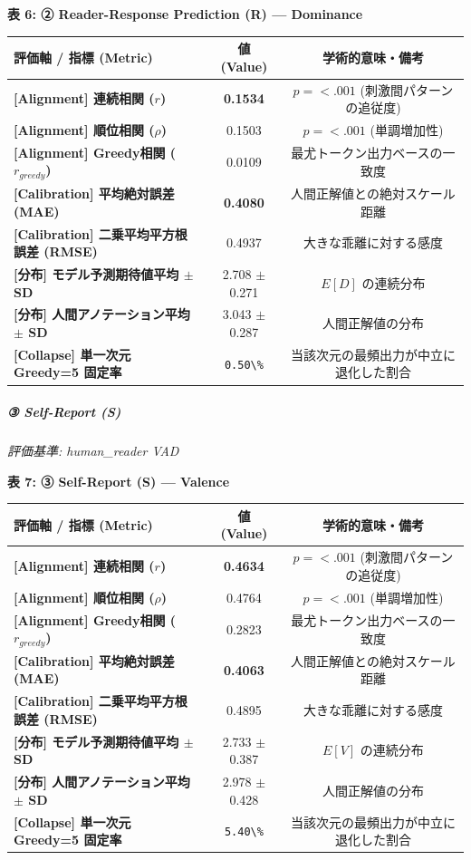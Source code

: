 \textbf{表 6: ② Reader-Response Prediction (R) — Dominance}
\begin{center}
\small
\begin{tabular}{lcc}
\toprule
\textbf{評価軸 / 指標 (Metric)} & \textbf{値 (Value)} & \textbf{学術的意味・備考} \\
\midrule
\textbf{[Alignment] 連続相関 ($r$)} & \textbf{0.1534} & $p = <.001 $ (刺激間パターンの追従度) \\
\textbf{[Alignment] 順位相関 ($\rho$)} & 0.1503 & $p = <.001 $ (単調増加性) \\
\textbf{[Alignment] Greedy相関 ($r_{greedy}$)} & 0.0109 & 最尤トークン出力ベースの一致度 \\
\textbf{[Calibration] 平均絶対誤差 (MAE)} & \textbf{0.4080} & 人間正解値との絶対スケール距離 \\
\textbf{[Calibration] 二乗平均平方根誤差 (RMSE)} & 0.4937 & 大きな乖離に対する感度 \\
\textbf{[分布] モデル予測期待値平均 $\pm$ SD} & 2.708 $\pm$ 0.271 & $E[D]$ の連続分布 \\
\textbf{[分布] 人間アノテーション平均 $\pm$ SD} & 3.043 $\pm$ 0.287 & 人間正解値の分布 \\
\textbf{[Collapse] 単一次元 Greedy=5 固定率} & \texttt{0.50\textbackslash{}\%} & 当該次元の最頻出力が中立に退化した割合 \\
\bottomrule
\end{tabular}
\end{center}


\subparagraph{③ Self-Report (S)}
\textit{評価基準: human\_reader VAD}

\textbf{表 7: ③ Self-Report (S) — Valence}
\begin{center}
\small
\begin{tabular}{lcc}
\toprule
\textbf{評価軸 / 指標 (Metric)} & \textbf{値 (Value)} & \textbf{学術的意味・備考} \\
\midrule
\textbf{[Alignment] 連続相関 ($r$)} & \textbf{0.4634} & $p = <.001 $ (刺激間パターンの追従度) \\
\textbf{[Alignment] 順位相関 ($\rho$)} & 0.4764 & $p = <.001 $ (単調増加性) \\
\textbf{[Alignment] Greedy相関 ($r_{greedy}$)} & 0.2823 & 最尤トークン出力ベースの一致度 \\
\textbf{[Calibration] 平均絶対誤差 (MAE)} & \textbf{0.4063} & 人間正解値との絶対スケール距離 \\
\textbf{[Calibration] 二乗平均平方根誤差 (RMSE)} & 0.4895 & 大きな乖離に対する感度 \\
\textbf{[分布] モデル予測期待値平均 $\pm$ SD} & 2.733 $\pm$ 0.387 & $E[V]$ の連続分布 \\
\textbf{[分布] 人間アノテーション平均 $\pm$ SD} & 2.978 $\pm$ 0.428 & 人間正解値の分布 \\
\textbf{[Collapse] 単一次元 Greedy=5 固定率} & \texttt{5.40\textbackslash{}\%} & 当該次元の最頻出力が中立に退化した割合 \\
\bottomrule
\end{tabular}
\end{center}


